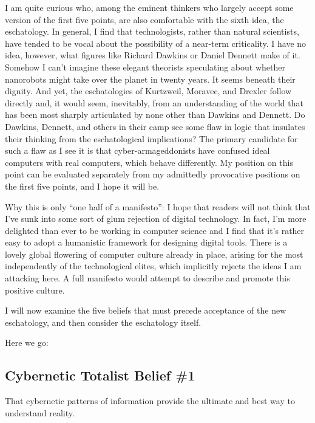 \documentclass[letterpaper,12pt,english]{sphinxmanual}
\begin{document}
I am quite curious who, among the eminent thinkers who largely accept some version of the first five points, are also comfortable with the sixth idea, the eschatology. In general, I find that technologists, rather than natural scientists, have tended to be vocal about the possibility of a near-term criticality. I have no idea, however, what figures like Richard Dawkins or Daniel Dennett make of it. Somehow I can't imagine these elegant theorists speculating about whether nanorobots might take over the planet in twenty years. It seems beneath their dignity. And yet, the eschatologies of Kurtzweil, Moravec, and Drexler follow directly and, it would seem, inevitably, from an understanding of the world that has been most sharply articulated by none other than Dawkins and Dennett. Do Dawkins, Dennett, and others in their camp see some flaw in logic that insulates their thinking from the eschatological implications? The primary candidate for such a flaw as I see it is that cyber-armageddonists have confused ideal computers with real computers, which behave differently. My position on this point can be evaluated separately from my admittedly provocative positions on the first five points, and I hope it will be.

Why this is only ``one half of a manifesto'': I hope that readers will not think that I've sunk into some sort of glum rejection of digital technology. In fact, I'm more delighted than ever to be working in computer science and I find that it's rather easy to adopt a humanistic framework for designing digital tools. There is a lovely global flowering of computer culture already in place, arising for the most independently of the technological elites, which implicitly rejects the ideas I am attacking here. A full manifesto would attempt to describe and promote this positive culture.

I will now examine the five beliefs that must precede acceptance of the new eschatology, and then consider the eschatology itself.

Here we go:


\subsection{Cybernetic Totalist Belief \#1}
\label{lanier:cybernetic-totalist-belief-1}
That cybernetic patterns of information provide the ultimate and best way to understand reality.
\end{document}
